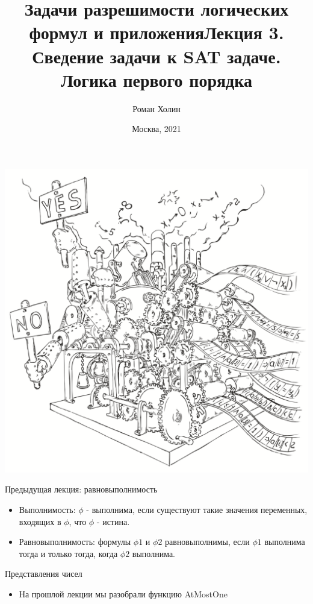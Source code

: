 \documentclass{beamer}
\begin{document}
\title{Задачи разрешимости логических формул и приложения\newline Лекция 3. Сведение задачи к SAT задаче. Логика первого порядка}
\author{Роман Холин}
\date{Москва, 2021}

\begin{frame}
\includegraphics[scale=0.5]{../decision-procedure.png}
\end{frame}

\frame{\titlepage}

\begin{frame}{Предыдущая лекция: равновыполнимость}
\begin{itemize}
\item Выполнимость: $\phi$ - выполнима, если существуют такие значения переменных, входящих в $\phi$, что $\phi$ - истина.
\item Равновыполнимость: формулы $\phi1$ и $\phi2$ равновыполнимы, если $\phi1$ выполнима тогда и только тогда, когда $\phi2$
выполнима.
\end{itemize}
\end{frame}

\begin{frame}{Представления чисел}
\begin{itemize}
\item На прошлой лекции мы разобрали функцию AtMostOne
\end{itemize}
\end{frame}
\end{document}

